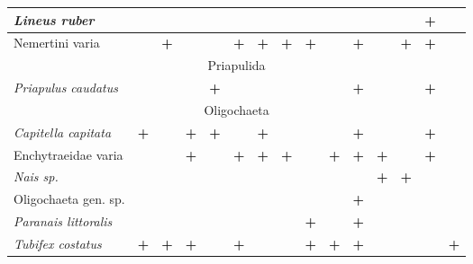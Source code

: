 \begin{footnotesize}
\begin{longtable}{|p{2.1cm}|p{0.38cm}p{0.38cm}|p{0.38cm}p{0.38cm}|p{0.38cm}p{0.38cm}|p{0.35cm}p{0.35cm}p{0.35cm}|p{1cm}|p{0.5cm}p{0.5cm}|p{1cm}|p{1cm}|}
{\it Lineus ruber}              &           &           &           &           &           &           &          &          &          &                 &          &          & \textbf{+}       &            \\  \hline
Nemertini varia           &           & \textbf{+}        &           &           & \textbf{+}        & \textbf{+}        & \textbf{+}       & \textbf{+}       &          & \textbf{+}              &          & \textbf{+}       & \textbf{+}       &            \\ \hline
\multicolumn{15}{|c|}{Priapulida} \\ \hline
{\it Priapulus caudatus}        &           &           &           & \textbf{+}        &           &           &          &          &          & \textbf{+}              &          &          & \textbf{+}       &            \\ \hline
\multicolumn{15}{|c|}{Oligochaeta} \\ \hline
{\it Capitella capitata}        & \textbf{+}        &           & \textbf{+}        & \textbf{+}        &           & \textbf{+}        &          &          &          & \textbf{+}              &          &          & \textbf{+}       &            \\  \hline
Enchytraeidae varia       &           &           & \textbf{+}        &           & \textbf{+}        & \textbf{+}        & \textbf{+}       &          & \textbf{+}       & \textbf{+}              & \textbf{+}       &          & \textbf{+}       &            \\  \hline
{\it Nais sp.}                  &           &           &           &           &           &           &          &          &          &                 & \textbf{+}       & \textbf{+}       &          &            \\  \hline
Oligochaeta gen. sp.      &           &           &           &           &           &           &          &          &          & \textbf{+}              &          &          &          &            \\  \hline
{\it Paranais littoralis}       &           &           &           &           &           &           &          & \textbf{+}       &          & \textbf{+}              &          &          &          &            \\  \hline
{\it Tubifex costatus}          & \textbf{+}        & \textbf{+}        & \textbf{+}        &           & \textbf{+}        &           &          & \textbf{+}       & \textbf{+}       & \textbf{+}              &          &          &          & \textbf{+}         \\  \hline

\end{longtable}
\end{footnotesize}
